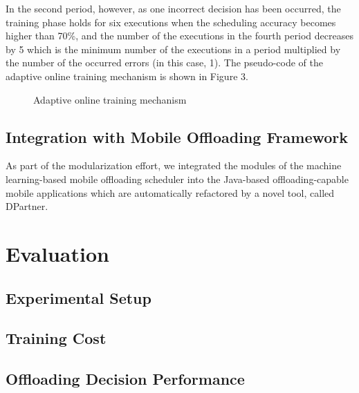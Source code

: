 \documentclass[10pt, conference, compsocconf]{IEEEtran}
\begin{document}
%
In the second period, however, as one incorrect decision has been
occurred, the training phase holds for six executions when the
scheduling accuracy becomes higher than 70\%, and the number of the
executions in the fourth period decreases by 5 which is the minimum
number of the executions in a period multiplied by the number of the
occurred errors (in this case, 1). 
%
The pseudo-code of the adaptive online training mechanism is shown in
Figure 3.
%
\begin{figure}
\begin{algorithmic}[1]
	\ELSE
		\ELSE
		\ENDIF
	\ENDIF
\ENDWHILE
\STATE
{}
\ELSE
\ENDIF
\end{algorithmic}
\caption{Adaptive online training mechanism}
\end{figure}
%
\subsection{Integration with Mobile Offloading Framework}
%
As part of the modularization effort, we integrated the modules of the
machine learning-based mobile offloading scheduler into the Java-based
offloading-capable mobile applications which are automatically
refactored by a novel tool, called DPartner.
%
\section{Evaluation}
%
\subsection{Experimental Setup}
%
\subsection{Training Cost}
%
\subsection{Offloading Decision Performance}
%
\end{document}
